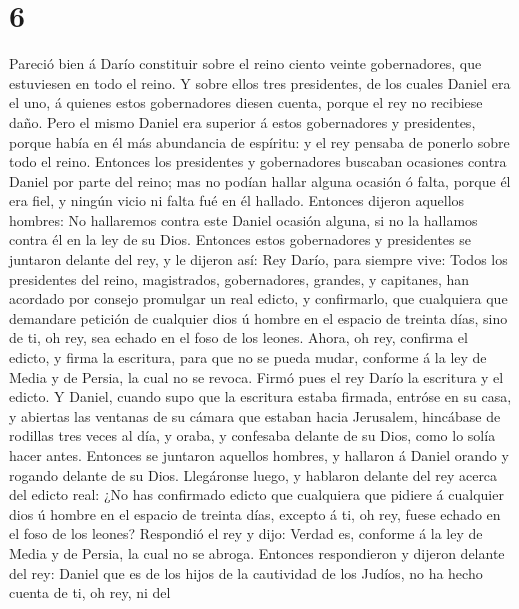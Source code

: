 \hypertarget{section-5}{%
\section{6}\label{section-5}}

 Pareció bien á Darío constituir sobre el reino ciento
veinte gobernadores, que estuviesen en todo el reino.  Y
sobre ellos tres presidentes, de los cuales Daniel era el uno, á quienes
estos gobernadores diesen cuenta, porque el rey no recibiese daño.
 Pero el mismo Daniel era superior á estos gobernadores y
presidentes, porque había en él más abundancia de espíritu: y el rey
pensaba de ponerlo sobre todo el reino.  Entonces los
presidentes y gobernadores buscaban ocasiones contra Daniel por parte
del reino; mas no podían hallar alguna ocasión ó falta, porque él era
fiel, y ningún vicio ni falta fué en él hallado.  Entonces
dijeron aquellos hombres: No hallaremos contra este Daniel ocasión
alguna, si no la hallamos contra él en la ley de su Dios. 
Entonces estos gobernadores y presidentes se juntaron delante del rey, y
le dijeron así: Rey Darío, para siempre vive:  Todos los
presidentes del reino, magistrados, gobernadores, grandes, y capitanes,
han acordado por consejo promulgar un real edicto, y confirmarlo, que
cualquiera que demandare petición de cualquier dios ú hombre en el
espacio de treinta días, sino de ti, oh rey, sea echado en el foso de
los leones.  Ahora, oh rey, confirma el edicto, y firma la
escritura, para que no se pueda mudar, conforme á la ley de Media y de
Persia, la cual no se revoca.  Firmó pues el rey Darío la
escritura y el edicto.  Y Daniel, cuando supo que la
escritura estaba firmada, entróse en su casa, y abiertas las ventanas de
su cámara que estaban hacia Jerusalem, hincábase de rodillas tres veces
al día, y oraba, y confesaba delante de su Dios, como lo solía hacer
antes.  Entonces se juntaron aquellos hombres, y hallaron
á Daniel orando y rogando delante de su Dios.  Llegáronse
luego, y hablaron delante del rey acerca del edicto real: ¿No has
confirmado edicto que cualquiera que pidiere á cualquier dios ú hombre
en el espacio de treinta días, excepto á ti, oh rey, fuese echado en el
foso de los leones? Respondió el rey y dijo: Verdad es, conforme á la
ley de Media y de Persia, la cual no se abroga.  Entonces
respondieron y dijeron delante del rey: Daniel que es de los hijos de la
cautividad de los Judíos, no ha hecho cuenta de ti, oh rey, ni del
